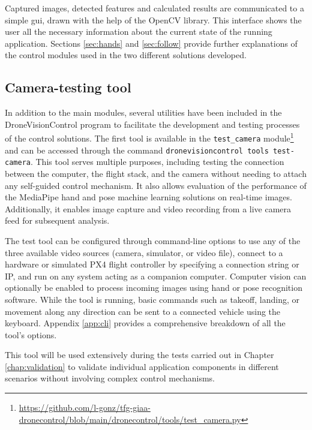 Captured images, detected features and calculated results are communicated to a simple \acrshort{gui}, drawn with the help of the OpenCV library. This interface shows the user all the necessary information about the current state of the running application. Sections \ref{sec:hands} and \ref{sec:follow} provide further explanations of the control modules used in the two different solutions developed.

\subsection{Camera-testing tool}
\label{subsec:cam-tool}

In addition to the main modules, several utilities have been included in the DroneVisionControl program to facilitate the development and testing processes of the control solutions. The first tool is available in the \texttt{test\_camera} module\footnote{\url{https://github.com/l-gonz/tfg-giaa-dronecontrol/blob/main/dronecontrol/tools/test_camera.py}} and can be accessed through the command \texttt{dronevisioncontrol tools test-camera}. This tool serves multiple purposes, including testing the connection between the computer, the flight stack, and the camera without needing to attach any self-guided control mechanism. It also allows evaluation of the performance of the MediaPipe hand and pose machine learning solutions on real-time images. Additionally, it enables image capture and video recording from a live camera feed for subsequent analysis. 

The test tool can be configured through command-line options to use any of the three available video sources (camera, simulator, or video file), connect to a hardware or simulated PX4 flight controller by specifying a connection string or IP, and run on any system acting as a companion computer. Computer vision can optionally be enabled to process incoming images using hand or pose recognition software. While the tool is running, basic commands such as takeoff, landing, or movement along any direction can be sent to a connected vehicle using the keyboard. Appendix \ref{app:cli} provides a comprehensive breakdown of all the tool's options.

This tool will be used extensively during the tests carried out in Chapter \ref{chap:validation} to validate individual application components in different scenarios without involving complex control mechanisms.
